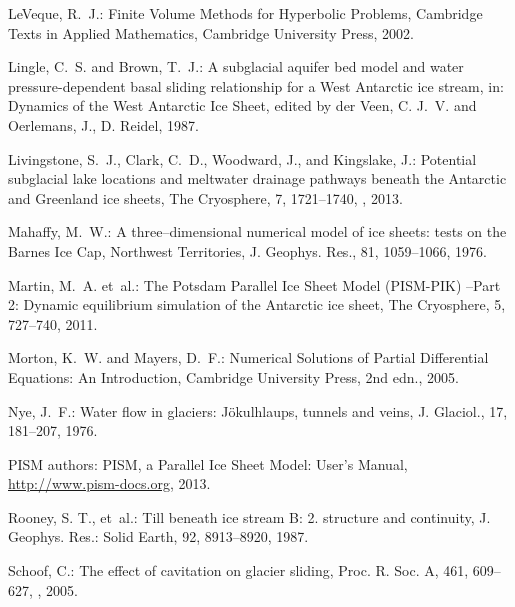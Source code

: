 \documentclass[gmd]{copernicus}   %
\begin{document}
\begin{thebibliography}{}
LeVeque, R.~J.: Finite Volume Methods for Hyperbolic Problems, Cambridge Texts
  in Applied Mathematics, Cambridge University Press, 2002.

Lingle, C.~S. and Brown, T.~J.: A subglacial aquifer bed model and water
  pressure-dependent basal sliding relationship for a {W}est {A}ntarctic ice
  stream, in: Dynamics of the {W}est {A}ntarctic {I}ce {S}heet, edited by der
  Veen, C. J.~V. and Oerlemans, J., D. Reidel, 1987.

Livingstone, S.~J., Clark, C.~D., Woodward, J., and Kingslake, J.: Potential
  subglacial lake locations and meltwater drainage pathways beneath the
  {A}ntarctic and {G}reenland ice sheets, The Cryosphere, 7, 1721--1740,
  , 2013.

Mahaffy, M.~W.: A three--dimensional numerical model of ice sheets: tests on
  the {B}arnes {I}ce {C}ap, {N}orthwest {T}erritories, J. Geophys. Res., 81,
  1059--1066, 1976.

Martin, M.~A. et~al.: The {P}otsdam {P}arallel {I}ce {S}heet
  {M}odel ({PISM-PIK}) --{P}art 2: {D}ynamic equilibrium simulation of the
  {A}ntarctic ice sheet, The Cryosphere, 5, 727--740, 2011.

Morton, K.~W. and Mayers, D.~F.: Numerical {S}olutions of {P}artial
  {D}ifferential {E}quations: {A}n {I}ntroduction, Cambridge University Press,
  2nd edn., 2005.

Nye, J.~F.: Water flow in glaciers: {J}\"okulhlaups, tunnels and veins, J.
  Glaciol., 17, 181--207, 1976.

{PISM authors}: {PISM}, a {P}arallel {I}ce {S}heet {M}odel: {U}ser's {M}anual,
  \url{http://www.pism-docs.org}, 2013.

Rooney, S. T., et~al.: Till beneath ice stream {B}: 2. structure and continuity,
  J. Geophys. Res.: Solid Earth, 92, 8913--8920, 1987.

Schoof, C.: The effect of cavitation on glacier sliding, Proc. R. Soc. A, 461,
  609--627, , 2005.


\end{thebibliography}
\end{document}
